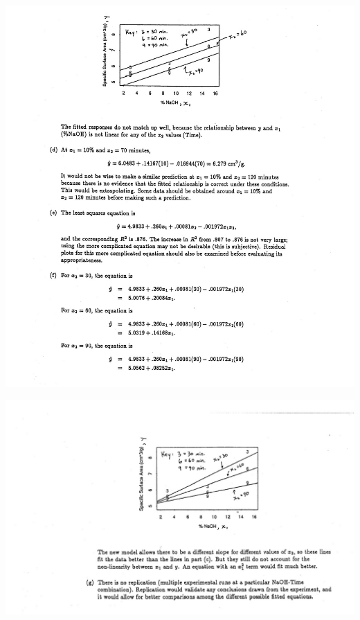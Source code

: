 \documentclass[11pt]{article}\usepackage[]{graphicx}\usepackage[]{color}
\begin{document}
\begin{enumerate}
	\begin{center}
	\begin{minipage}{\linewidth}
		\centering
		\includegraphics[width=\textwidth]{07.JPG}
	\end{minipage}
\end{center}

	\begin{center}
	\begin{minipage}{\linewidth}
		\centering
		\includegraphics[width=\textwidth]{08.JPG}
	\end{minipage}
\end{center}







\end{enumerate}
\end{document}
